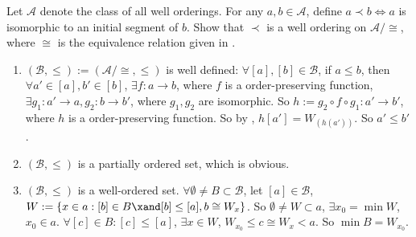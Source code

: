 \documentclass{ctexart}
\begin{document}
\begin{problem}
Let $\mathcal{A}$ denote the class of all well orderings. For any $a,b\in\mathcal{A}$, define $a\prec b\iff a$ is isomorphic to an initial segment of $b$. Show that $\prec$ is a well ordering on $\mathcal{A}/\cong$, where $\cong$ is the equivalence relation given in .  
\end{problem}
\begin{solution}
    \begin{enumerate}
        \item $(\mathcal{B},\le):=(\mathcal{A}/\cong,\le)$ is well defined: $\forall [a],[b]\in \mathcal{B}$, if $a\le b$, then $\forall a'\in [a], b'\in [b]$, $\exists f:a\to b$, where $f$ is a order-preserving function, $\exists g_1: a'\to a, g_2:b\to b'$, where $g_1,g_2$ are isomorphic. So $h:=g_2\circ f\circ g_1: a'\to b'$, where $h$ is a order-preserving function. So by , $h[a']=W_{(h(a'))}$. So $a'\le b'$.
        \item $(\mathcal{B},\le)$ is a partially ordered set, which is obvious.
        \item $(\mathcal{B},\le)$ is a well-ordered set. $\forall \emptyset\neq B\subset  \mathcal{B}$, let $[a]\in \mathcal{B}$, $W:=\{x\in a: [b]\in B\xand [b]\le [a], b\cong W_{x}\}$.
        So $\emptyset \neq W\subset a$, $\exists x_0=\min W$, $x_0\in a$. $\forall [c]\in B: [c]\leq [a]$, $\exists x\in W$, $W_{x_0}\leq c\cong W_{x}<a$. So $\min B=W_{x_0}$.

    \end{enumerate}
\end{solution}
\end{document}
